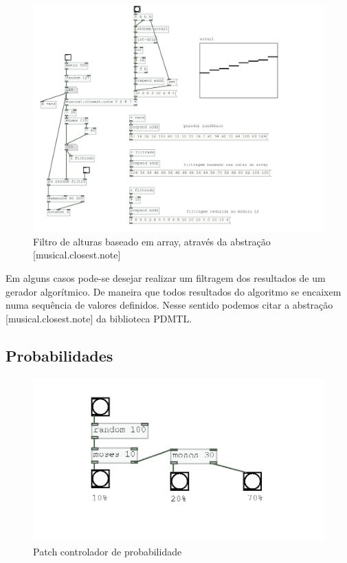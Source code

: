 \documentclass{ppgmus}
\begin{document}
\begin{figure}
\includegraphics[scale=.6]{filtro-alturas}
\caption{Filtro de alturas baseado em array, através da abstração [musical.closest.note]}
\label{filtro-alturas}
\end{figure}  

Em alguns casos pode-se desejar realizar um filtragem
dos resultados de um gerador algorítmico. De maneira que
todos resultados do algoritmo se encaixem numa sequência
de valores definidos. Nesse sentido podemos citar a abstração
[musical.closest.note] da biblioteca PDMTL.




\subsection{Probabilidades}

\begin{figure}
\includegraphics[scale=.6]{probabilidade-simples}
\caption{Patch controlador de probabilidade}
\label{prob-simples}
\end{figure}  
\end{document}

